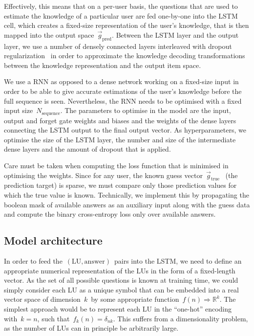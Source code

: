 Effectively, this means that on a per-user basis, the questions that are used to estimate the knowledge of a particular user are fed one-by-one into the LSTM cell, which creates a fixed-size representation of the user's knowledge, that is then mapped into the output space~$\vec{g}_\mathrm{pred}$. Between the LSTM layer and the output layer, we use a number of densely connected layers interleaved with dropout regularization~\cite{srivastava2014dropout} in order to approximate the knowledge decoding transformations between the knowledge representation and the output item space.

We use a RNN as opposed to a dense network working on a fixed-size input in order to be able to give accurate estimations of the user's knowledge before the full sequence is seen. Nevertheless, the RNN needs to be optimised with a fixed input size~$N_{\mathrm{sequence}}$. The parameters to optimise in the model are the input, output and forget gate weights and biases and the weights of the dense layers connecting the LSTM output to the final output vector. As hyperparameters, we optimise the size of the LSTM layer, the number and size of the intermediate dense layers and the amount of dropout that is applied.

Care must be taken when computing the loss function that is minimised in optimising the weights. Since for any user, the known guess vector~$\vec{g}_\mathrm{true}$~ (the prediction target) is sparse, we must compare only those prediction values for which the true value is known. Technically, we implement this by propagating the boolean mask of available answers as an auxiliary input along with the guess data and compute the binary cross-entropy loss only over available answers.

\subsection{Model architecture}
\label{sec:nlp_model_architecture}
In order to feed the~$(\mathrm{LU}, \mathrm{answer})$~pairs into the LSTM, we need to define an appropriate numerical representation of the LUs in the form of a fixed-length vector. As the set of all possible questions is known at training time, we could simply consider each LU as a unique symbol that can be embedded into a real vector space of dimension~$k$~by some appropriate function~$f(n) \Rightarrow \mathbb{R}^k$. The simplest approach would be to represent each LU in the ``one-hot'' encoding with~$k=n$, such that~$f_k(n) = \delta_{nk}$. This suffers from a dimensionality problem, as the number of LUs can in principle be arbitrarily large.

